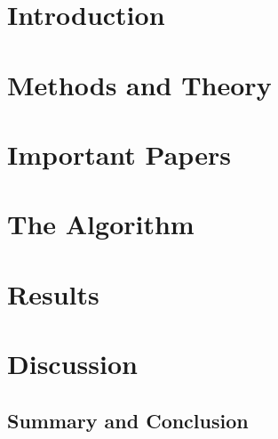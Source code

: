 
\mainmatter


\chapter{Introduction}

\FloatBarrier

\chapter{Methods and Theory}


\chapter[History]{Important Papers}

\FloatBarrier



\chapter{The Algorithm}

\clearpage

\FloatBarrier

\chapter{Results}

\FloatBarrier


\chapter{Discussion}


\begin{fullwidth}
\chapter{Summary and Conclusion}

\end{fullwidth}
